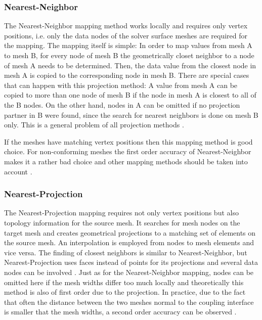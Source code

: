   \subsubsection{Nearest-Neighbor}\label{sec:Coupl-DataMapping-NN}
   The Nearest-Neighbor mapping method works locally and requires only vertex positions, i.e. only the data nodes of the solver surface meshes are required for the mapping. The mapping itself is simple: In order to map values from mesh A to mesh B, for every node of mesh B the geometrically closet neighbor to a node of mesh A needs to be determined. Then, the data value from the closest node in mesh A is copied to the corresponding node in mesh B. There are special cases that can happen with this projection method: A value from mesh A can be copied to more than one node of mesh B if the node in mesh A is closest to all of the B nodes. On the other hand, nodes in A can be omitted if no projection partner in B were found, since the search for nearest neighbors is done on mesh B only. This is a general problem of all projection methods \cite{gatzhammer2015efficient}.
   
   If the meshes have matching vertex positions then this mapping method is good choice. For non-conforming meshes the first order accuracy of Nearest-Neighbor makes it a rather bad choice and other mapping methods should be taken into account \cite{bungartz2015fully}.
  
  \subsubsection{Nearest-Projection}\label{sec:Coupl-DataMapping-NP}
   The Nearest-Projection mapping requires not only vertex positions but also topology information for the source mesh. It searches for mesh nodes on the target mesh and creates geometrical projections to a matching set of elements on the source mesh. An interpolation is employed from nodes to mesh elements and vice versa. The finding of closest neighbors is similar to Nearest-Neighbor, but Nearest-Projection uses faces instead of points for its projections and several data nodes can be involved \cite{gatzhammer2015efficient}. Just as for the Nearest-Neighbor mapping, nodes can be omitted here if the mesh widths differ too much locally and theoretically this method is also of first order due to the projection. In practice, due to the fact that often the distance between the two meshes normal to the coupling interface is smaller that the mesh widths, a second order accuracy can be observed \cite{bungartz2015fully}.
  
